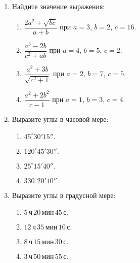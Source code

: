 \documentclass[12pt]{article}
\begin{document}
\begin{enumerate}
    \item Найдите значение выражения:
    \begin{multicols}{2}
		\begin{enumerate}[label=\textbf{\Alph*.}]
			\item{
                \(\dfrac{2a^2 + \sqrt{bc}}{a + b}\) при \(a = 3\), \(b = 2\), \(c = 16\).
            } \item{
                \(\dfrac{a^3 - 2b}{c^2 + ab}\) при \(a = 4\), \(b = 5\), \(c = 2\).
            }
			\item{
                \(\dfrac{a^2 + 3b}{\sqrt{c^2 + 1}}\) при \(a = 2\), \(b = 7\), \(c = 5\).
            } \item{
                \(\dfrac{a^2 + 2b^2}{c - 1}\) при \(a = 1\), \(b = 3\), \(c = 4\).
            } 
		\end{enumerate}
	\end{multicols}
     
    \item Выразите углы в часовой мере:
    \begin{multicols}{2}
		\begin{enumerate}[label=\textbf{\Alph*.}]
			\item{
                $45^\circ 30' 15''.$
            } \item{
                $120^\circ 45' 30''.$
            }
			\item{
                $25^\circ 15' 40''.$
            } \item{
                $330^\circ 20' 10''.$
            } 
		\end{enumerate}
	\end{multicols}

    \item Выразите углы в градусной мере:
    \begin{multicols}{2}
		\begin{enumerate}[label=\textbf{\Alph*.}]
			\item{
                $5 \, \text{ч} \, 20 \, \text{мин} \, 45 \, \text{с}.$
            } \item{
                $12 \, \text{ч} \, 35 \, \text{мин} \, 10 \, \text{с}.$
            }
			\item{
                $8 \, \text{ч} \, 15 \, \text{мин} \, 30 \, \text{с}.$
            } \item{
                $3 \, \text{ч} \, 50 \, \text{мин} \, 55 \, \text{с}.$
            } 
		\end{enumerate}
	\end{multicols}


\end{enumerate}
\end{document}
